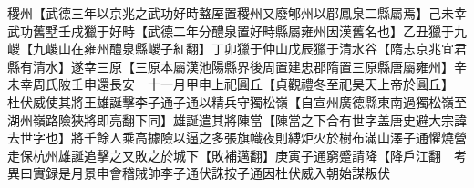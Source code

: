 稷州【武德三年以京兆之武功好時盩厔置稷州又廢郇州以郿鳳泉二縣屬焉】己未幸武功舊墅壬戌獵于好畤【武德二年分醴泉置好畤縣屬雍州因漢舊名也】乙丑獵于九嵕【九嵕山在雍州醴泉縣嵕子紅翻】丁卯獵于仲山戊辰獵于清水谷【隋志京兆宜君縣有清水】遂幸三原【三原本屬漢池陽縣界後周置建忠郡隋置三原縣唐屬雍州】辛未幸周氏陂壬申還長安　十一月甲申上祀圓丘【貞觀禮冬至祀昊天上帝於圓丘】　杜伏威使其將王雄誕擊李子通子通以精兵守獨松嶺【自宣州廣德縣東南過獨松嶺至湖州嶺路險狹將即亮翻下同】雄誕遣其將陳當【陳當之下合有世字盖唐史避大宗諱去世字也】將千餘人乘高據險以逼之多張旗幟夜則縛炬火於樹布滿山澤子通懼燒營走保杭州雄誕追擊之又敗之於城下【敗補邁翻】庚寅子通窮蹙請降【降戶江翻　考異曰實録是月景申會稽賊帥李子通伏誅按子通因杜伏威入朝始謀叛伏